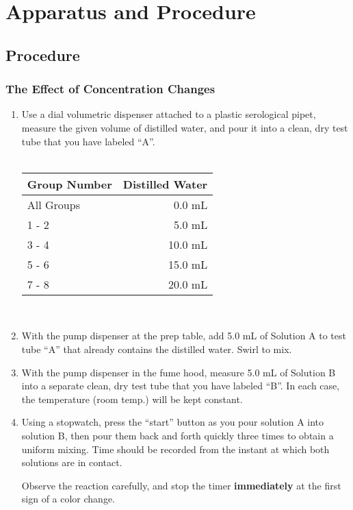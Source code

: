 \documentclass[11pt]{article}
\begin{document}
\section{Apparatus and Procedure}

\subsection{Procedure}
\subsubsection{The Effect of Concentration Changes }
\begin{enumerate}
\item		Use	a	dial	volumetric	dispenser	attached	to	a	plastic	serological	pipet,	measure	the	given	volume	of	distilled	water,	and	pour	it	into	a	clean,	dry	test	tube	that	
you	have	labeled	“A”. \\ \\
\begin{tabular}{ | l | r |}
\hline \textbf{\large{Group Number}} & \textbf{\large{Distilled Water}}\\ \hline
	All Groups & 0.0 mL \\ \hline
	1 - 2 	& 5.0 	mL		\\ \hline
	3 - 4 	& 10.0 	mL	\\ \hline
	5 - 6 	& 15.0 	mL\\ \hline
	7 - 8 	& 20.0 	mL	\\ \hline
\end{tabular} \\
\item With	the	pump	dispenser	at	the	prep	table,	add	5.0	mL	of	Solution	A	to	test	tube	“A”	that	already	contains	the	distilled	water.		Swirl	to	mix.	
	
\item With	the	pump	dispenser	in	the	fume	hood,	measure	5.0	mL	of	Solution	B	into	a	separate	clean,	dry	test	tube	that	you	have	labeled	“B”.			
In	each	case,	the	temperature	(room	temp.)	will	be	kept	constant.	
	
\item Using	a	stopwatch,	press	 the	“start”	button	as	you	pour	solution	A	into	solution	B,	 then	pour	 them	back	and	 forth	quickly	 three	 times	 to	obtain	a	uniform	
mixing.		Time	should	be	recorded	from	the	instant	at	which	both	solutions	are	in	contact.	
	
Observe	the	reaction	carefully,	and	stop	the	timer	\textbf{immediately}	at	the	first	sign	of	a	color	change.	
	

\end{enumerate}
\end{document}
